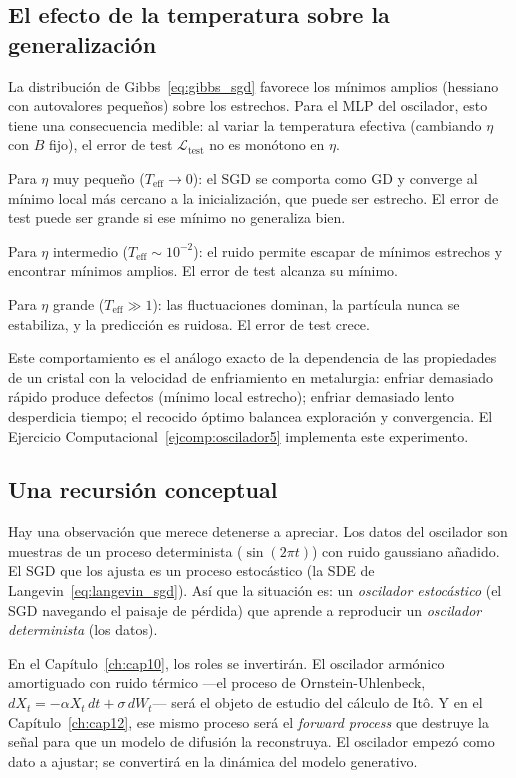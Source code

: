 \subsection{El efecto de la temperatura sobre la generalización}
\label{subsec:osc_temperatura}

La distribución de Gibbs~\eqref{eq:gibbs_sgd} favorece los mínimos amplios
(hessiano con autovalores pequeños) sobre los estrechos. Para el MLP del
oscilador, esto tiene una consecuencia medible: al variar la temperatura
efectiva (cambiando $\eta$ con $B$ fijo), el error de test
$\mathcal{L}_{\text{test}}$ no es monótono en $\eta$.

Para $\eta$ muy pequeño ($T_{\text{eff}} \to 0$): el SGD se comporta como
GD y converge al mínimo local más cercano a la inicialización, que puede ser
estrecho. El error de test puede ser grande si ese mínimo no generaliza bien.

Para $\eta$ intermedio ($T_{\text{eff}} \sim 10^{-2}$): el ruido permite
escapar de mínimos estrechos y encontrar mínimos amplios. El error de test
alcanza su mínimo.

Para $\eta$ grande ($T_{\text{eff}} \gg 1$): las fluctuaciones dominan, la
partícula nunca se estabiliza, y la predicción es ruidosa. El error de test
crece.

Este comportamiento es el análogo exacto de la dependencia de las
propiedades de un cristal con la velocidad de enfriamiento en metalurgia:
enfriar demasiado rápido produce defectos (mínimo local estrecho); enfriar
demasiado lento desperdicia tiempo; el recocido óptimo balancea exploración
y convergencia. El Ejercicio Computacional~\ref{ejcomp:oscilador5}
implementa este experimento.

\subsection{Una recursión conceptual}
\label{subsec:osc_recursion}

Hay una observación que merece detenerse a apreciar. Los datos del
oscilador son muestras de un proceso determinista ($\sin(2\pi t)$) con
ruido gaussiano añadido. El SGD que los ajusta es un proceso estocástico
(la SDE de Langevin~\eqref{eq:langevin_sgd}). Así que la situación es:
un \emph{oscilador estocástico} (el SGD navegando el paisaje de pérdida)
que aprende a reproducir un \emph{oscilador determinista} (los datos).

En el Capítulo~\ref{ch:cap10}, los roles se invertirán. El oscilador
armónico amortiguado con ruido térmico ---el proceso de Ornstein-Uhlenbeck,
$dX_t = -\alpha X_t\,dt + \sigma\,dW_t$--- será el objeto de estudio del
cálculo de Itô. Y en el Capítulo~\ref{ch:cap12}, ese mismo proceso será el
\textit{forward process} que destruye la señal para que un modelo de
difusión la reconstruya. El oscilador empezó como dato a ajustar; se
convertirá en la dinámica del modelo generativo.


